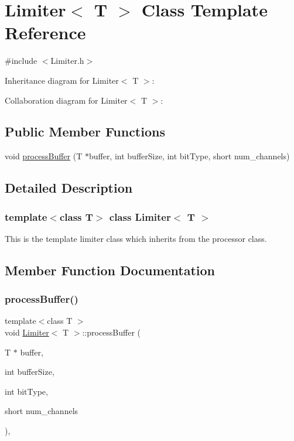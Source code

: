 \hypertarget{classLimiter}{}\section{Limiter$<$ T $>$ Class Template Reference}
\label{classLimiter}


{\ttfamily \#include $<$Limiter.\+h$>$}



Inheritance diagram for Limiter$<$ T $>$\+:


Collaboration diagram for Limiter$<$ T $>$\+:
\subsection*{Public Member Functions}
\begin{DoxyCompactItemize}
\item 
void \hyperlink{classLimiter_a1388f0a0c881ac7e3be1b834db9257c1}{process\+Buffer} (T $\ast$buffer, int buffer\+Size, int bit\+Type, short num\+\_\+channels)
\end{DoxyCompactItemize}


\subsection{Detailed Description}
\subsubsection*{template$<$class T$>$\newline
class Limiter$<$ T $>$}

This is the template limiter class which inherits from the processor class. 

\subsection{Member Function Documentation}
\mbox{\label{classLimiter_a1388f0a0c881ac7e3be1b834db9257c1}} 
\subsubsection{\texorpdfstring{process\+Buffer()}{processBuffer()}}
{\footnotesize\ttfamily template$<$class T $>$ \\
void \hyperlink{classLimiter}{Limiter}$<$ T $>$\+::process\+Buffer (\begin{DoxyParamCaption}\item[{T $\ast$}]{buffer,  }\item[{int}]{buffer\+Size,  }\item[{int}]{bit\+Type,  }\item[{short}]{num\+\_\+channels }\end{DoxyParamCaption})\hspace{0.3cm}{\ttfamily [inline]}, {\ttfamily [virtual]}}

